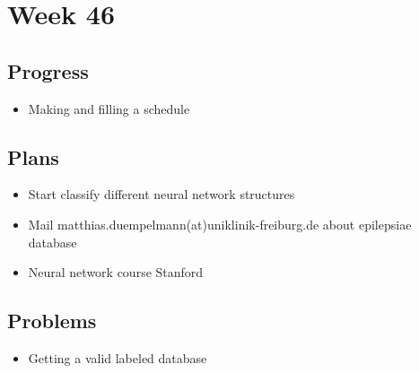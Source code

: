 \section*{Week 46}
    \subsection*{Progress}
        \begin{itemize}
            \item Making and filling a schedule
        \end{itemize}
        
    \subsection*{Plans}
        \begin{itemize}
            \item Start classify different neural network structures
            \item Mail matthias.duempelmann(at)uniklinik-freiburg.de about epilepsiae database
            \item Neural network course Stanford
        \end{itemize}
    
    \subsection*{Problems}
        \begin{itemize}
            \item Getting a valid labeled database
            
            
        \end{itemize}
\clearpage